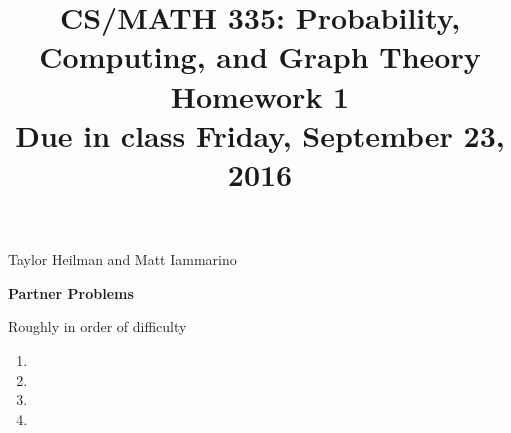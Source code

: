\documentclass[11pt]{amsart}
\begin{document}
\title[CS/MATH 335 HW 2]{CS/MATH 335: Probability, Computing, and Graph Theory \\ Homework 1\\ Due in class Friday, September 23, 2016}
\maketitle

{Taylor Heilman and Matt Iammarino}

\textbf{Partner Problems}

Roughly in order of difficulty

\begin{enumerate}

\item {} 

{


}

\item {}

{





}

\item {}

{


}
\item {}

{

}
\end{enumerate}
\end{document}
